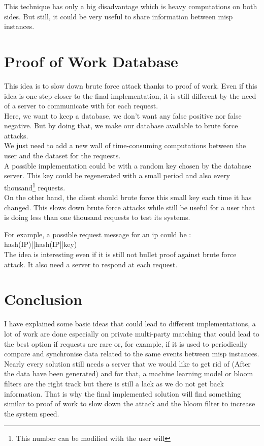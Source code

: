 \documentclass{eplmastersthesis}
\begin{document}
This technique has only a big disadvantage which is heavy computations on both sides. But still, it could be very useful to share information between \gls{misp} instances.

\section{Proof of Work Database}
This idea is to slow down brute force attack thanks to proof of work. Even if this idea is one step closer to the final implementation, it is still different by the need of a server to communicate with for each request.\\

Here, we want to keep a database, we don't want any false positive nor false negative. But by doing that, we make our database available to brute force attacks.\\
We just need to add a new wall of time-consuming computations between the user and the dataset for the requests.\\

A possible implementation could be with a random key chosen by the database server. This key could be regenerated with a small period and also every thousand\footnote{This number can be modified with the user will} requests.\\
On the other hand, the client should brute force this small key each time it has changed. This slows down brute force attacks while still be useful for a user that is doing less than one thousand requests to test its systems.

For example, a possible request message for an \gls{ip} could be : hash(IP)||hash(IP||key)\\

The idea is interesting even if it is still not bullet proof against brute force attack. It also need a server to respond at each request.

\section{Conclusion}
I have explained some basic ideas that could lead to different implementations, a lot of work are done especially on private multi-party matching that could lead to the best option if requests are rare or, for example, if it is used to periodically compare and synchronise data related to the same events between \gls{misp} instances.\\
Nearly every solution still needs a server that we would like to get rid of (After the data have been generated) and for that, a machine learning model or bloom filters are the right track but there is still a lack as we do not get back information. That is why the final implemented solution will find something similar to proof of work to slow down the attack and the bloom filter to increase the system speed.
\end{document}
